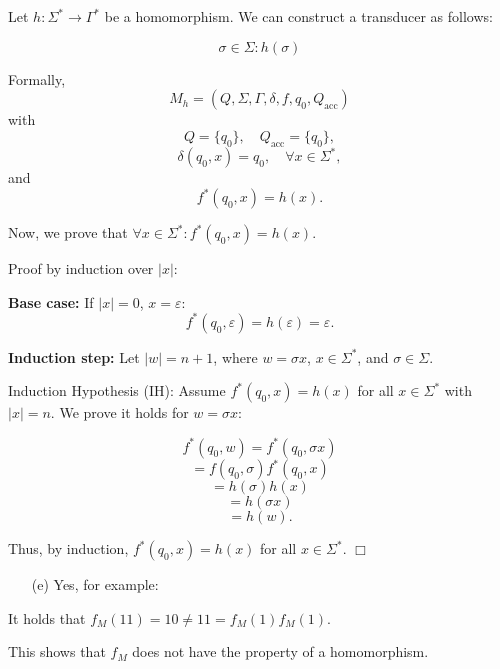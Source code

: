 Let \( h: \Sigma^* \to \Gamma^* \) be a homomorphism.  
We can construct a transducer as follows:

\[
\sigma \in \Sigma: h(\sigma)
\]

Formally, 
\[
M_h = (Q, \Sigma, \Gamma, \delta, f, q_0, Q_{\text{acc}})
\]
with
\[
Q = \{ q_0 \}, \quad Q_{\text{acc}} = \{ q_0 \},
\]
\[
\delta(q_0, x) = q_0, \quad \forall x \in \Sigma^*,
\]
and
\[
f^*(q_0, x) = h(x).
\]

Now, we prove that \( \forall x \in \Sigma^* : f^*(q_0, x) = h(x) \).

Proof by induction over \( |x| \):  

\textbf{Base case:}  
If \( |x| = 0 \), \( x = \varepsilon \):  
\[
f^*(q_0, \varepsilon) = h(\varepsilon) = \varepsilon.
\]

\textbf{Induction step:}  
Let \( |w| = n + 1 \), where \( w = \sigma x \), \( x \in \Sigma^* \), and \( \sigma \in \Sigma \).

Induction Hypothesis (IH): Assume \( f^*(q_0, x) = h(x) \) for all \( x \in \Sigma^* \) with \( |x| = n \).  
We prove it holds for \( w = \sigma x \):  

\[
f^*(q_0, w) = f^*(q_0, \sigma x)
\]
\[
= f(q_0, \sigma) f^*(q_0, x)
\]
\[
= h(\sigma) h(x)
\]
\[
= h(\sigma x)
\]
\[
= h(w).
\]

Thus, by induction, \( f^*(q_0, x) = h(x) \) for all \( x \in \Sigma^* \). \(\Box\)

\begin{itemize}
    \item[(e)] Yes, for example:
\end{itemize}
\begin{center}
\end{center}

It holds that $f_M(11) = 10 \neq 11 = f_M(1)f_M(1)$.

This shows that $f_M$ does not have the property of a homomorphism.



